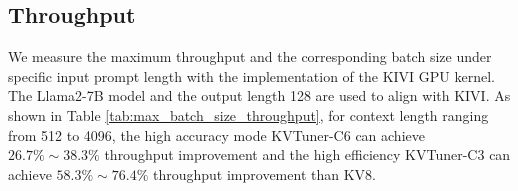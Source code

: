 \subsection{Throughput}
We measure the maximum throughput and the corresponding batch size under specific input prompt length with the implementation of the KIVI GPU kernel. 
The Llama2-7B model and the output length 128 are used to align with KIVI. 
As shown in Table \ref{tab:max_batch_size_throughput}, for context length ranging from 512 to 4096, the high accuracy mode KVTuner-C6 can achieve $26.7\%\sim38.3\%$ throughput improvement and the high efficiency KVTuner-C3 can achieve $58.3\%\sim76.4\%$ throughput improvement than KV8. %
\begin{table}[h]
\centering
{}
\caption{Maximum throughput {\scriptsize\textcolor{gray}{(and the corresponding batch size)}} of Llama2-7B on a Nvidia L40 48GB GPU with optimized KIVI KV cache quantization and dequantization CUDA kernels.}
\label{tab:max_batch_size_throughput}
\vspace{-2em}
\end{table}

